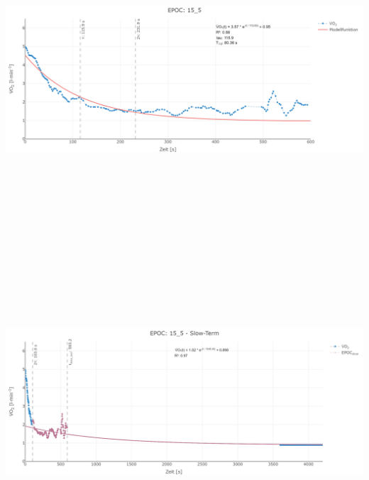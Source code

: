 \documentclass[
  letterpaper,
  DIV=11]{scrartcl}
\begin{document}
\includegraphics[width=11.45833in,height=4.6875in]{images/15_5_tau.png}
\includegraphics[width=11.45833in,height=4.6875in]{images/15_5_slow.png}
\end{document}
